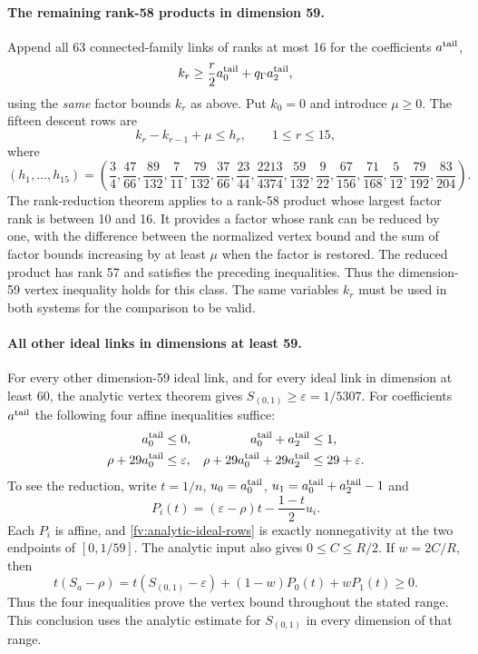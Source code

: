 \documentclass[11pt]{article}
\theoremstyle{definition}
\theoremstyle{remark}
\numberwithin{equation}{section}
\begin{document}
\paragraph{The remaining rank-58 products in dimension 59.}
Append all 63 connected-family links of ranks at most 16 for the
coefficients $a^{\rm tail}$,
\begin{equation}\label{fv:tail-factor-links}
             k_r\ge\frac r2a^{\rm tail}_0
                                      +q_\Gamma a^{\rm tail}_2,
\end{equation}
using the \emph{same} factor bounds $k_r$ as above. Put $k_0=0$ and introduce
$\mu\ge0$. The fifteen descent rows are
\begin{equation}\label{fv:descent}
 k_r-k_{r-1}+\mu\le h_r,\qquad 1\le r\le15,
\end{equation}
where
\[
 (h_1,\ldots,h_{15})=
 \left(\frac34,\frac{47}{66},\frac{89}{132},\frac7{11},
 \frac{79}{132},\frac{37}{66},\frac{23}{44},
 \frac{2213}{4374},\frac{59}{132},\frac9{22},
 \frac{67}{156},\frac{71}{168},\frac5{12},
 \frac{79}{192},\frac{83}{204}\right).
\]
The rank-reduction theorem applies to a rank-58 product whose largest
factor rank is between 10 and 16. It provides a factor whose rank
can be reduced by one, with the difference between the normalized
vertex bound and the sum of factor bounds increasing by at least
$\mu$ when the factor is restored. The reduced product has rank 57
and satisfies the preceding inequalities. Thus the dimension-59
vertex inequality holds for this class. The same variables $k_r$
must be used in both systems for the comparison to be valid.

\paragraph{All other ideal links in dimensions at least 59.}
For every other dimension-59 ideal link, and for every ideal link
in dimension at least 60, the analytic vertex theorem gives
$S_{(0,1)}\ge\varepsilon=1/5307$. For coefficients
$a^{\rm tail}$ the following four affine inequalities suffice:
\begin{align}
 a^{\rm tail}_0&\le0,&
 a^{\rm tail}_0+a^{\rm tail}_2&\le1,\notag\\
 \rho+29a^{\rm tail}_0&\le\varepsilon,&
 \rho+29a^{\rm tail}_0+29a^{\rm tail}_2&\le29+\varepsilon.
 \label{fv:analytic-ideal-rows}
\end{align}
To see the reduction, write $t=1/n$,
$u_0=a^{\rm tail}_0$, $u_1=a^{\rm tail}_0+a^{\rm tail}_2-1$ and
\[
 P_i(t)=(\varepsilon-\rho)t-\frac{1-t}{2}u_i.
\]
Each $P_i$ is affine, and \eqref{fv:analytic-ideal-rows} is exactly
nonnegativity at the two endpoints of $[0,1/59]$. The analytic input
also gives $0\le C\le R/2$. If $w=2C/R$, then
\[
 t(S_a-\rho)=t(S_{(0,1)}-\varepsilon)
                         +(1-w)P_0(t)+wP_1(t)\ge0.
\]
Thus the four inequalities prove the vertex bound throughout the
stated range. This conclusion uses the analytic estimate for
$S_{(0,1)}$ in every dimension of that range.
\end{document}
